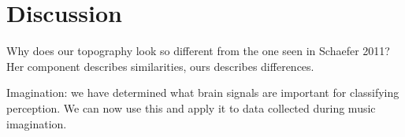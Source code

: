 \chapter*{Discussion}

Why does our topography look so different from the one seen in Schaefer 2011? Her component describes similarities, ours describes differences. 

Imagination: we have determined what brain signals are important for classifying perception. We can now use this and apply it to data collected during music imagination.